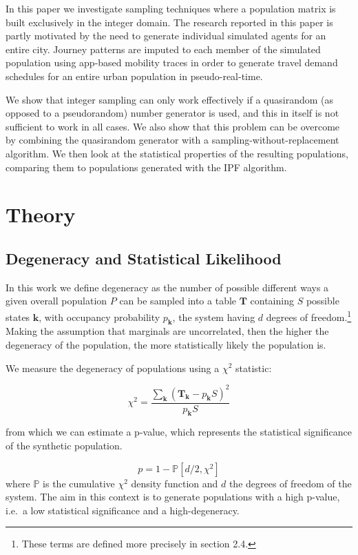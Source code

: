 \documentclass[]{article}
\let\rmarkdownfootnote\footnote%
\def\footnote{\protect\rmarkdownfootnote}
\begin{document}
In this paper we investigate sampling techniques where a population
matrix is built exclusively in the integer domain. The research reported 
in this paper is partly motivated by the need to generate individual 
simulated agents for an entire city.  Journey patterns are imputed to 
each member of the simulated population using app-based mobility traces 
in order to generate travel demand schedules for an entire urban population 
in pseudo-real-time.  

We show that integer sampling can only work effectively if a quasirandom (as opposed to a
pseudorandom) number generator is used, and this in itself is not
sufficient to work in all cases. We also show that this problem can be
overcome by combining the quasirandom generator with a
sampling-without-replacement algorithm. We then look at the statistical
properties of the resulting populations, comparing them to populations
generated with the IPF algorithm.

\section{Theory}\label{theory}

\subsection{Degeneracy and Statistical
Likelihood}\label{degeneracy-and-statistical-likelihood}

In this work we define degeneracy as the number of possible different
ways a given overall population \(P\) can be sampled into a table
\(\mathbf{T}\) containing \(S\) possible states \(\mathbf{k}\), with
occupancy probability \(p_\mathbf{k}\), the system having \(d\) degrees
of freedom.\footnote{These terms are defined more precisely in section
  2.4.} Making the assumption that marginals are uncorrelated, then the
higher the degeneracy of the population, the more statistically likely
the population is.

We measure the degeneracy of populations using a \(\chi^2\) statistic:

\[\chi^2 = \frac{\sum\limits_{\mathbf{k}}(\mathbf{T}_\mathbf{k}-p_\mathbf{k}S)^2}{p_\mathbf{k}S}\]

from which we can estimate a p-value, which represents the statistical
significance of the synthetic population.

\[p=1-\mathbb{P}[d/2,\chi^2]\] where \(\mathbb{P}\) is the cumulative
\(\chi^2\) density function and \(d\) the degrees of freedom of the
system. The aim in this context is to generate populations with a high
p-value, i.e.~a low statistical significance and a high-degeneracy.
\end{document}
